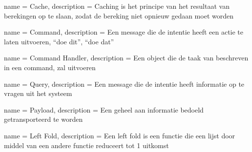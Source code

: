 {
  name = Cache,
  description = {Caching is het principe van het resultaat van berekingen op te slaan, zodat de bereking niet opnieuw gedaan moet worden}
}

{
  name = Command,
  description = {Een message die de intentie heeft een actie te laten uitvoeren, ``doe dit'', ``doe dat''}
}

{
  name = {Command Handler},
  description = {Een object die de taak van beschreven in een command, zal uitvoeren}
}

{
  name = Query,
  description = {Een message die de intentie heeft informatie op te vragen uit het systeem}
}

{
  name = Payload,
  description = {Een geheel aan informatie bedoeld getransporteerd te worden}
}

{
  name = {Left Fold},
  description = {Een left fold is een functie die een lijst door middel van een andere functie reduceert tot 1 uitkomst}
}


\printglossary[type=\acronymtype,title={Lijst van acroniemen}]

\printglossary
{}

